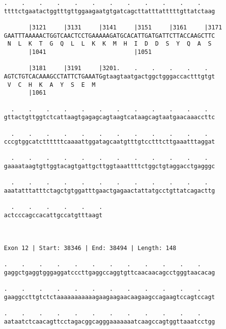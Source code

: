 \documentclass{article}
\begin{document}
\begin{Verbatim}
.    .    .    .    .    .    .    .    .    .    .    .    
ttttctgaatactggtttgttggaagaatgtgatcagcttatttatttttgttatctaag
                                                            
       |3121     |3131     |3141     |3151     |3161     |3171
GAATTTAAAAACTGGTCAACTCCTGAAAAAGATGCACATTGATGATTCTTACCAAGCTTC
 N  L  K  T  G  Q  L  L  K  K  M  H  I  D  D  S  Y  Q  A  S 
       |1041                         |1051                  
  
       |3181     |3191     |3201.    .    .    .    .    .  
AGTCTGTCACAAAGCCTATTCTGAAATGgtaagtaatgactggctgggaccactttgtgt
 V  C  H  K  A  Y  S  E  M                                  
       |1061                                                
  
  .    .    .    .    .    .    .    .    .    .    .    .  
gttactgttggtctcattaagtgagagcagtaagtcataagcagtaatgaacaaaccttc
                                                            
  .    .    .    .    .    .    .    .    .    .    .    .  
cccgtggcatcttttttcaaaattggatagcaatgtttgtcctttcttgaaatttaggat
                                                            
  .    .    .    .    .    .    .    .    .    .    .    .  
gaaaataagtgttggtacagtgattgcttggtaaattttctggctgtaggacctgagggc
                                                            
  .    .    .    .    .    .    .    .    .    .    .    .  
aaatatttatttctagctgtggatttgaactgagaactattatgcctgttatcagacttg
                                                            
  .    .    .    .    .    .
actcccagccacattgccatgtttaagt
                            
                            
 
Exon 12 | Start: 38346 | End: 38494 | Length: 148
 
.    .    .    .    .    .    .    .    .    .    .    .    
gaggctgaggtgggaggatcccttgaggccaggtgttcaacaacagcctgggtaacacag
                                                            
.    .    .    .    .    .    .    .    .    .    .    .    
gaaggccttgtctctaaaaaaaaaaagaagaagaacaagaagccagaagtccagtccagt
                                                            
.    .    .    .    .    .    .    .    .    .    .    .    
aataatctcaacagttcctagacggcagggaaaaaaatcaagccagtggttaaatcctgg
                                                            

\end{Verbatim}
\end{document}
